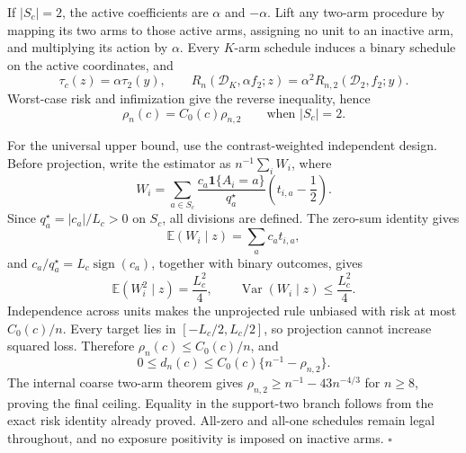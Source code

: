 If \(|S_c|=2\), the active coefficients are \(\alpha\) and \(-\alpha\). Lift any two-arm procedure by mapping its two arms to those active arms, assigning no unit to an inactive arm, and multiplying its action by \(\alpha\). Every \(K\)-arm schedule induces a binary schedule on the active coordinates, and
\[
 \tau_c(z)=\alpha\tau_2(y),
 \qquad
 R_n(\mathcal D_K,\alpha f_2;z)=\alpha^2R_{n,2}(\mathcal D_2,f_2;y).
\]
Worst-case risk and infimization give the reverse inequality, hence
\[
 \rho_n(c)=C_0(c)\rho_{n,2}
 \qquad\text{when }|S_c|=2.
\]

For the universal upper bound, use the contrast-weighted independent design. Before projection, write the estimator as \(n^{-1}\sum_iW_i\), where
\[
 W_i=\sum_{a\in S_c}\frac{c_a\mathbf1\{A_i=a\}}{q_a^\star}
 \left(t_{i,a}-\frac12\right).
\]
Since \(q_a^\star=|c_a|/L_c>0\) on \(S_c\), all divisions are defined. The zero-sum identity gives
\[
 \mathbb E(W_i\mid z)=\sum_ac_at_{i,a},
\]
and \(c_a/q_a^\star=L_c\operatorname{sign}(c_a)\), together with binary outcomes, gives
\[
 \mathbb E(W_i^2\mid z)=\frac{L_c^2}{4},
 \qquad
 \operatorname{Var}(W_i\mid z)\leq\frac{L_c^2}{4}.
\]
Independence across units makes the unprojected rule unbiased with risk at most \(C_0(c)/n\). Every target lies in \([-L_c/2,L_c/2]\), so projection cannot increase squared loss. Therefore \(\rho_n(c)\leq C_0(c)/n\), and
\[
 0\leq d_n(c)\leq C_0(c)\{n^{-1}-\rho_{n,2}\}.
\]
The internal coarse two-arm theorem gives \(\rho_{n,2}\geq n^{-1}-43n^{-4/3}\) for \(n\geq8\), proving the final ceiling. Equality in the support-two branch follows from the exact risk identity already proved. All-zero and all-one schedules remain legal throughout, and no exposure positivity is imposed on inactive arms. \(\square\)